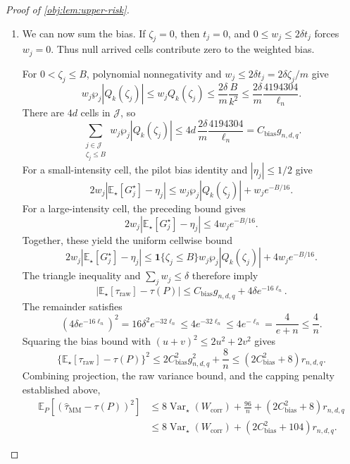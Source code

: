 \documentclass[11pt]{article}
\begin{document}
\begin{proof}[Proof of \cref{obj:lem:upper-risk}]
\begin{enumerate}
For \(\zeta_j\ge B\), Cauchy--Schwarz and \(\wp_j^2\le\wp_j\) yield
\[
\{\wp_j|\mathbb E_\star[H_j^\star]|\}^2
\le\wp_j\mathbb E_\star[(H_j^\star)^2]
\le e^{-\zeta_j/8},
\]
and hence
\[
\wp_j|\mathbb E_\star[H_j^\star]|
\le e^{-\zeta_j/16}.
\]
Using
\(\eta_jQ_k(\zeta_j)=\eta_j-\mathbb E_\star[H_j^\star]\), we obtain
\[
\begin{aligned}
\wp_j|\eta_jQ_k(\zeta_j)|
&\le\frac{\wp_j}{2}
+\wp_j|\mathbb E_\star[H_j^\star]|\\
&\le\frac32e^{-B/16}.
\end{aligned}
\]
The pilot bias identity therefore gives, on these large-intensity cells,
\[
|\mathbb E_\star[G_j^\star]-\eta_j|
\le2e^{-B/16}.
\]

\item We can now sum the bias. If \(\zeta_j=0\), then \(t_j=0\), and
\(0\le w_j\le2\delta t_j\) forces \(w_j=0\). Thus null arrived cells contribute zero to the weighted bias.

For \(0<\zeta_j\le B\), polynomial nonnegativity and
\(w_j\le2\delta t_j=2\delta\zeta_j/m\) give
\[
w_j\wp_j|Q_k(\zeta_j)|
\le w_jQ_k(\zeta_j)
\le\frac{2\delta}{m}\frac{B}{k^2}
\le\frac{2\delta}{m}\frac{4194304}{\ell_n}.
\]
There are \(4d\) cells in \(\mathcal J\), so
\[
\sum_{\substack{j\in\mathcal J\\\zeta_j\le B}}
w_j\wp_j|Q_k(\zeta_j)|
\le
4d\,\frac{2\delta}{m}\frac{4194304}{\ell_n}
=C_{\mathrm{bias}}g_{n,d,q}.
\]
For a small-intensity cell, the pilot bias identity and
\(|\eta_j|\le1/2\) give
\[
2w_j|\mathbb E_\star[G_j^\star]-\eta_j|
\le w_j\wp_j|Q_k(\zeta_j)|+w_je^{-B/16}.
\]
For a large-intensity cell, the preceding bound gives
\[
2w_j|\mathbb E_\star[G_j^\star]-\eta_j|
\le4w_je^{-B/16}.
\]
Together, these yield the uniform cellwise bound
\[
2w_j|\mathbb E_\star[G_j^\star]-\eta_j|
\le
\mathbf1\{\zeta_j\le B\}w_j\wp_j|Q_k(\zeta_j)|
+4w_je^{-B/16}.
\]
The triangle inequality and \(\sum_jw_j\le\delta\) therefore imply
\[
|\mathbb E_\star[\tau_{\mathrm{raw}}]-\tau(P)|
\le C_{\mathrm{bias}}g_{n,d,q}
+4\delta e^{-16\ell_n}.
\]
The remainder satisfies
\[
(4\delta e^{-16\ell_n})^2
=16\delta^2e^{-32\ell_n}
\le4e^{-32\ell_n}
\le4e^{-\ell_n}
=\frac4{e+n}
\le\frac4n.
\]
Squaring the bias bound with \((u+v)^2\le2u^2+2v^2\) gives
\[
\{\mathbb E_\star[\tau_{\mathrm{raw}}]-\tau(P)\}^2
\le
2C_{\mathrm{bias}}^2g_{n,d,q}^2+\frac8n
\le(2C_{\mathrm{bias}}^2+8)r_{n,d,q}.
\]
Combining projection, the raw variance bound, and the capping penalty established above,
\[
\begin{aligned}
\mathbb E_P[(\widehat\tau_{\mathrm{MM}}-\tau(P))^2]
&\le
8\operatorname{Var}_\star(W_{\mathrm{corr}})
+\frac{96}{n}
+(2C_{\mathrm{bias}}^2+8)r_{n,d,q}\\
&\le
8\operatorname{Var}_\star(W_{\mathrm{corr}})
+(2C_{\mathrm{bias}}^2+104)r_{n,d,q}.
\end{aligned}
\]


\end{enumerate}
\end{proof}
\end{document}
